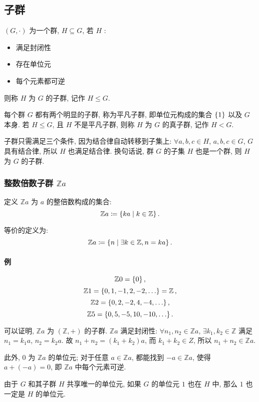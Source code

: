 \documentclass[UTF8]{ctexart}
\theoremstyle{mystyle}
\theoremstyle{myremark}
\theoremstyle{plain}
\newcommand{\Z}{\mathbb Z}
\DeclarePairedDelimiter\set{\{}{\}}
\begin{document}
\subsection{子群}
\begin{definition}[\text{子群}]
    $ (G, \cdot) $ 为一个群, $ H \subseteq G $, 若 $ H $ :
    \begin{itemize}
        \item 满足封闭性
        \item 存在单位元
        \item 每个元素都可逆
    \end{itemize}
    则称 $ H $ 为 $ G $ 的子群, 记作 $ H \le G $.

    每个群 $ G $ 都有两个明显的子群, 称为平凡子群, 即单位元构成的集合 $ \set{1} $ 以及 $ G $ 本身. 若 $ H \le G $, 且 $ H $ 不是平凡子群, 则称 $ H $ 为 $ G $ 的真子群, 记作 $ H < G $.
\end{definition}

子群只需满足三个条件, 因为结合律自动转移到子集上: $ \forall a, b, c \in H $, $ a, b, c \in G $, $ G $ 具有结合律, 所以 $ H $ 也满足结合律. 换句话说, 群 $ G $ 的子集 $ H $ 也是一个群, 则 $ H $ 为 $ G $ 的子群.


\subsubsection{整数倍数子群 $ \Z a $}
定义 $ \Z a $ 为 $ a $ 的整倍数构成的集合:
\[ \Z a \coloneqq \set{k a \mid k \in \Z} \,.\]

等价的定义为:
\[ \Z a \coloneqq \set{n \mid \exists k \in \Z, n = k a} \,.\]

\paragraph{例}
\[ \Z 0 = \set{0} \,,\]
\[ \Z 1 = \set{0, 1, -1, 2, -2, \dots} = \Z \,,\]
\[ \Z 2 = \set{0, 2, -2, 4, -4, \dots} \,,\]
\[ \Z 5 = \set{0, 5, -5, 10, -10, \dots} \,.\]


可以证明, $ \Z a $ 为 $ (\Z, +) $ 的子群. $ \Z a $ 满足封闭性: $ \forall n_1, n_2 \in \Z a $, $ \exists k_1, k_2 \in \Z $ 满足 $ n_1 = k_1 a $, $ n_2 = k_2 a $. 故 $ n_1 + n_2 = (k_1 + k_2) a $, 而 $ k_1 + k_2 \in Z $, 所以 $ n_1 + n_2 \in \Z a $.

此外, $ 0 $ 为 $ \Z a $ 的单位元; 对于任意 $ a \in \Z a $, 都能找到 $ -a \in \Z a $, 使得 $ a + (-a) = 0 $, 即 $ \Z a $ 中每个元素可逆.

 
由于 $ G $ 和其子群 $ H $ 共享唯一的单位元, 如果 $ G $ 的单位元 $ 1 $ 也在 $ H $ 中, 那么 $ 1 $ 也一定是 $ H $ 的单位元.
\end{document}
